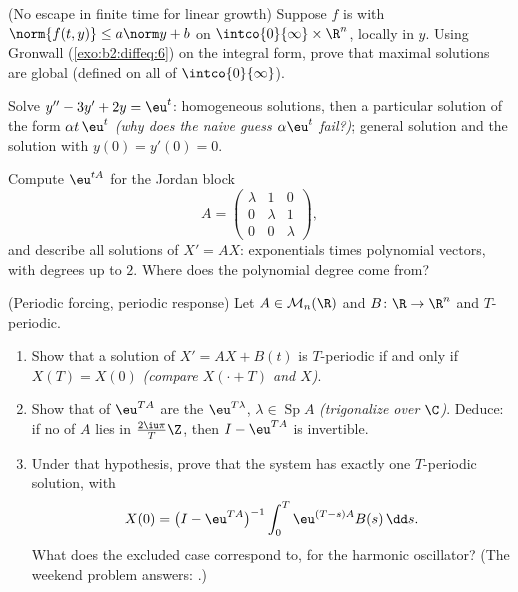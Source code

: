 \begin{exercise}[$\star\star\star$]\label{exo:b2:diffeq:9}
(No escape in finite time for linear growth) Suppose $f$ is
 with $\norm{f(t, y)} \leq a\norm y + b$ on
$\intco{0}{\infty} \times \R^n$, locally  in $y$. Using
Gronwall (\cref{exo:b2:diffeq:6}) on the integral form, prove that
maximal solutions are global (defined on all of
$\intco{0}{\infty}$).
\end{exercise}

\begin{exercise}[$\star$]\label{exo:b2:diffeq:10}
Solve $y'' - 3y' + 2y = \eu^{t}$: homogeneous solutions, then a
particular solution of the form $\alpha t\,\eu^{t}$ \emph{(why
does the naive guess $\alpha\eu^t$ fail?)}; general solution and
the solution with $y(0) = y'(0) = 0$.
\end{exercise}

\begin{exercise}[$\star\star$]\label{exo:b2:diffeq:11}
Compute $\eu^{tA}$ for the Jordan block
\[
A = \begin{pmatrix} \lambda & 1 & 0\\ 0 & \lambda & 1\\
0 & 0 & \lambda\end{pmatrix},
\]
and describe all solutions of $X' = AX$: exponentials times
polynomial vectors, with degrees up to $2$. Where does the
polynomial degree come from?
\end{exercise}

\begin{exercise}[$\star\star\star$]\label{exo:b2:diffeq:12}
(Periodic forcing, periodic response) Let $A \in
\mathcal{M}_n(\R)$ and $B \colon \R \to \R^n$  and
$T$-periodic.
\begin{enumerate}
  \item Show that a solution of $X' = AX + B(t)$ is
        $T$-periodic if and only if $X(T) = X(0)$
        \emph{(compare $X(\cdot + T)$ and $X$)}.
  \item Show that  of $\eu^{TA}$ are the
        $\eu^{T\lambda}$, $\lambda \in \operatorname{Sp}A$
        \emph{(trigonalize over $\C$)}. Deduce: if no
         of $A$ lies in $\frac{2\iu\pi}{T}\Z$, then
        $I - \eu^{TA}$ is invertible.
  \item Under that hypothesis, prove that the system has
        exactly one $T$-periodic solution, with
        \[
        X(0) = \bigl(I - \eu^{TA}\bigr)^{-1}
        \int_0^{T}\eu^{(T-s)A}B(s)\,\dd s .
        \]
        What does the excluded case correspond to, for the
        harmonic oscillator? (The weekend problem answers:
        .)
\end{enumerate}
\end{exercise}

